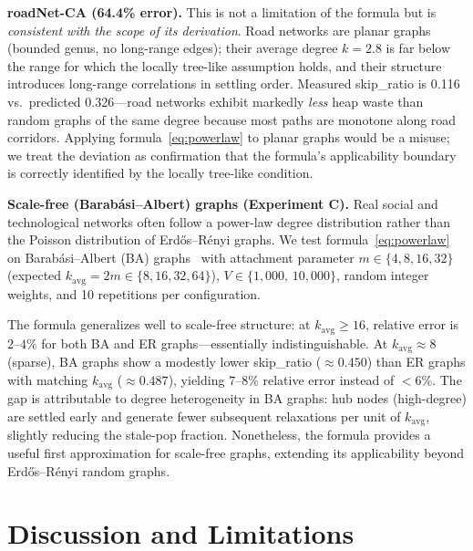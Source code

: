 \documentclass[conference]{IEEEtran}
\begin{document}
\noindent\textbf{roadNet-CA (64.4\% error).}
This is not a limitation of the formula but is \emph{consistent with
the scope of its derivation}.  Road networks are planar graphs (bounded genus, no
long-range edges); their average degree $k=2.8$ is far below the range
for which the locally tree-like assumption holds, and their structure
introduces long-range correlations in settling order.  Measured
skip\_ratio is 0.116 vs.\ predicted 0.326---road networks exhibit
markedly \emph{less} heap waste than random graphs of the same degree
because most paths are monotone along road corridors.  Applying
formula~\eqref{eq:powerlaw} to planar graphs would be a misuse; we treat
the deviation as confirmation that the formula's applicability boundary
is correctly identified by the locally tree-like condition.

\noindent\textbf{Scale-free (Barab\'{a}si--Albert) graphs (Experiment C).}
Real social and technological networks often follow a power-law degree
distribution rather than the Poisson distribution of Erd\H{o}s--R\'{e}nyi
graphs.  We test formula~\eqref{eq:powerlaw} on Barab\'{a}si--Albert (BA)
graphs~\cite{barabasi1999} with attachment parameter $m\in\{4,8,16,32\}$
(expected $k_{\mathrm{avg}}=2m\in\{8,16,32,64\}$), $V\in\{1{,}000,\,10{,}000\}$,
random integer weights, and 10 repetitions per configuration.

The formula generalizes well to scale-free structure: at
$k_{\mathrm{avg}}\geq 16$, relative error is $2$--$4\%$ for both BA and ER
graphs---essentially indistinguishable.  At $k_{\mathrm{avg}}\approx 8$
(sparse), BA graphs show a modestly lower skip\_ratio ($\approx 0.450$) than
ER graphs with matching $k_{\mathrm{avg}}$ ($\approx 0.487$), yielding
$7$--$8\%$ relative error instead of $<6\%$.  The gap is attributable to
degree heterogeneity in BA graphs: hub nodes (high-degree) are settled
early and generate fewer subsequent relaxations per unit of $k_{\mathrm{avg}}$,
slightly reducing the stale-pop fraction.  Nonetheless, the formula provides
a useful first approximation for scale-free graphs, extending its applicability
beyond Erd\H{o}s--R\'enyi random graphs.

\section{Discussion and Limitations}
\label{sec:discussion}
\end{document}
